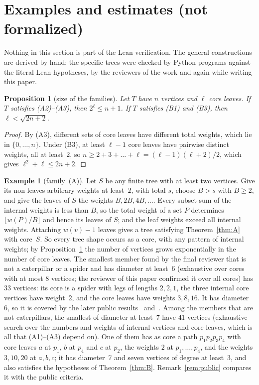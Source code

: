 \documentclass[11pt]{article}
\newtheorem{proposition}[lemma]{Proposition}
\theoremstyle{definition}
\newtheorem{example}[lemma]{Example}
\theoremstyle{remark}
\begin{document}
\section{Examples and estimates (not formalized)}\label{sec:examples}

Nothing in this section is part of the Lean verification. The general
constructions are derived by hand; the specific trees were checked by Python
programs against the literal Lean hypotheses, by the reviewers of the work and
again while writing this paper.

\begin{proposition}[size of the families]\label{prop:size}
Let $T$ have $n$ vertices and $\ell$ core leaves. If $T$ satisfies (A2)--(A3),
then $2^\ell\le n+1$. If $T$ satisfies (B1) and (B3), then $\ell<\sqrt{2n+2}$.
\end{proposition}

\begin{proof}
By (A3), different sets of core leaves have different total weights, which lie
in $\{0,\dots,n\}$. Under (B3), at least $\ell-1$ core leaves have pairwise
distinct weights, all at least~$2$, so $n\ge2+3+\dots+\ell=(\ell-1)(\ell+2)/2$,
which gives $\ell^2+\ell\le 2n+2$.
\end{proof}

\begin{example}[family~(A)]\label{ex:A}
Let $S$ be any finite tree with at least two vertices. Give its non-leaves
arbitrary weights at least~$2$, with total $s$, choose $B>s$ with $B\ge2$, and
give the leaves of $S$ the weights $B,2B,4B,\dots$. Every subset sum of the
internal weights is less than $B$, so the total weight of a set $P$ determines
$\lfloor w(P)/B\rfloor$ and hence its leaves of $S$; and the leaf weights exceed
all internal weights. Attaching $w(v)-1$ leaves gives a tree satisfying
Theorem~\ref{thm:A} with core~$S$. So every tree shape occurs as a core, with any
pattern of internal weights; by Proposition~\ref{prop:size} the number of
vertices grows exponentially in the number of core leaves. The smallest member
found by the final reviewer that is not a caterpillar or a spider and has
diameter at least~$6$ (exhaustive over cores with at most $8$ vertices; the
reviewer of this paper confirmed it over all cores) has $33$ vertices: its core
is a spider with legs of lengths $2,2,1$, the three internal core vertices have
weight~$2$, and the core leaves have weights $3,8,16$. It has diameter~$6$, so
it is covered by the later public results~\cite{kyf} and~\cite[pull
request~1081]{sc}. Among the
members that are not caterpillars, the smallest of diameter at least~$7$ have
$41$ vertices (exhaustive search over the numbers and weights of internal
vertices and core leaves, which is all that (A1)--(A3) depend on). One of them
has as core a path $p_1p_2p_3p_4$ with core leaves $a$ at $p_1$, $b$ at $p_4$ and
$c$ at $p_2$, the weights $2$ at $p_1,\dots,p_4$, and the weights $3,10,20$ at
$a,b,c$; it has diameter~$7$ and seven vertices of degree at least~$3$, and also
satisfies the hypotheses of Theorem~\ref{thm:B}. Remark~\ref{rem:public} compares
it with the public criteria.
\end{example}
\end{document}

